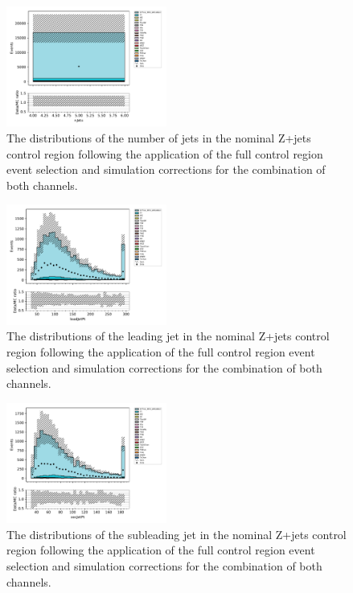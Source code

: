 \begin{figure}[tbp]
\centering
\includegraphics[width=0.47\textwidth]{figs/tzq-fullSelection-plots/plots_ee_zPlus/nJets.pdf}
\caption{
The distributions of the number of jets in the nominal Z+jets control region following the application of the full control region event selection and simulation corrections for the combination of both channels.
}
\label{fig:zPlusCR_nJets}
\end{figure}

\begin{figure}[tbp]
\centering
\includegraphics[width=0.47\textwidth]{figs/tzq-fullSelection-plots/plots_ee_zPlus/leadJetPt.pdf}
\caption{
The distributions of the leading jet \pt in the nominal Z+jets control region following the application of the full control region event selection and simulation corrections for the combination of both channels.
}
\label{fig:zPlusCR_leadJetPt}
\end{figure}

\begin{figure}[tbp]
\centering
\includegraphics[width=0.47\textwidth]{figs/tzq-fullSelection-plots/plots_ee_zPlus/secJetPt.pdf}
\caption{
The distributions of the subleading jet \pt in the nominal Z+jets control region following the application of the full control region event selection and simulation corrections for the combination of both channels.
}
\label{fig:zPlusCR_secJetPt}
\end{figure}

